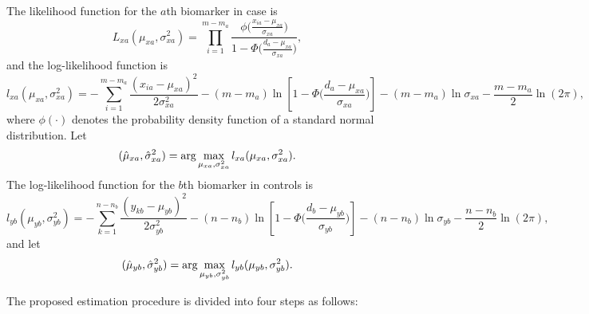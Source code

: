 \documentclass[a4,11pt,epsf, amssymb]{article}
\begin{document}
The likelihood function for the $a$th biomarker in case is
$$L_{xa}(\mu_{xa},\sigma_{xa}^2)=\prod\limits_{i=1}^{m-m_a} \frac{\phi\big(\frac{x_{ia}-\mu_{xa}}{\sigma_{xa}}\big)}{1-\Phi\big(\frac{d_a-\mu_{xa}}{\sigma_{xa}}\big)},$$
and the log-likelihood function is
$$l_{xa}(\mu_{xa},\sigma_{xa}^2) = -\sum_{i=1}^{m-m_a}\frac{(x_{ia}-\mu_{xa})^2}{2\sigma_{xa}^2}-(m-m_a)\ln\left[1-\Phi\Big(\frac{d_a-\mu_{xa}}{\sigma_{xa}}\Big)\right]-(m-m_a)\ln\sigma_{xa}-\frac{m-m_a}{2}\ln(2\pi),$$
where $\phi(\cdot)$ denotes the probability density  function of a standard normal distribution.
Let
$$(\hat\mu_{xa},\hat\sigma_{xa}^2) = \hbox{arg}\max\limits_{\mu_{xa},\sigma_{xa}^2} l_{xa}(\mu_{xa},\sigma_{xa}^2).$$
%
The log-likelihood function for the $b$th biomarker in controls is
$$l_{yb}(\mu_{yb},\sigma_{yb}^2) = -\sum_{k=1}^{n-n_b}\frac{(y_{kb}-\mu_{yb})^2}{2\sigma_{yb}^2}-(n-n_b)\ln\left[1-\Phi\Big(\frac{d_b-\mu_{yb}}{\sigma_{yb}}\Big)\right]-(n-n_b)\ln\sigma_{yb}-\frac{n-n_b}{2}\ln(2\pi),$$
and let
$$(\hat\mu_{yb},\hat\sigma_{yb}^2) = \hbox{arg}\max\limits_{\mu_{yb},\sigma_{yb}^2} l_{yb}(\mu_{yb},\sigma_{yb}^2).$$


The proposed estimation procedure is divided into four steps as follows:
\end{document}
